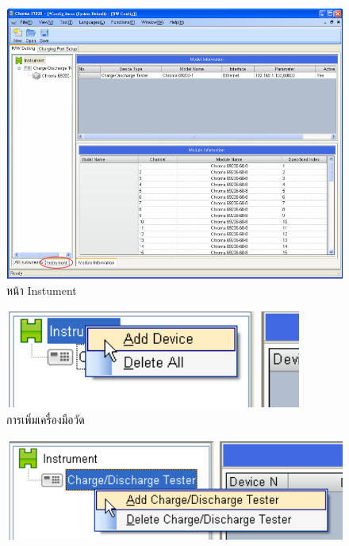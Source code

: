 \begin{center}
	\begin{figure}[H]
		\includegraphics[width=1\linewidth]{Chapters/img/17020_Program/HW_Configulation/Device_Tree.png}
			\centering
			\captionsetup{justification=centering,margin=2cm}
			\caption{หน้า Instument}
	\end{figure}
	\begin{figure}[H]
		\includegraphics[width=1\linewidth]{Chapters/img/17020_Program/HW_Configulation/Adding_a_device.png}
			\centering
			\captionsetup{justification=centering,margin=2cm}
			\caption{การเพิ่มเครื่องมือวัด}
	\end{figure}
	\begin{figure}[H]
		\includegraphics[width=1\linewidth]{Chapters/img/17020_Program/HW_Configulation/Adding_Charge.png}

\end{figure}
\end{center}

